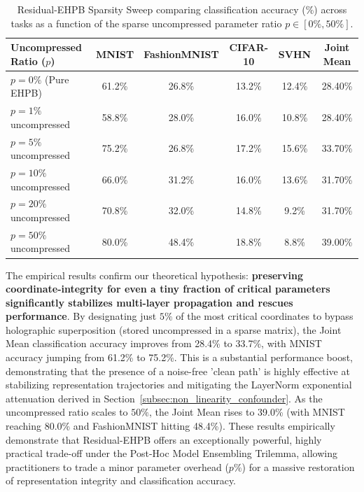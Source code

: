 \documentclass{article}
\theoremstyle{plain}
\theoremstyle{definition}
\theoremstyle{remark}
\begin{document}
\begin{table}[h]
\caption{Residual-EHPB Sparsity Sweep comparing classification accuracy (\%) across tasks as a function of the sparse uncompressed parameter ratio $p \in [0\%, 50\%]$.}
\label{tab:residual_ehpb_sweep_app}
\vskip 0.15in
\begin{center}
\begin{small}
\begin{sc}
\begin{tabular}{lccccc}
\toprule
Uncompressed Ratio ($p$) & MNIST & FashionMNIST & CIFAR-10 & SVHN & Joint Mean \\
\midrule
$p = 0\%$ (Pure EHPB) & 61.2\% & 26.8\% & 13.2\% & 12.4\% & 28.40\% \\
$p = 1\%$ uncompressed & 58.8\% & 28.0\% & 16.0\% & 10.8\% & 28.40\% \\
$p = 5\%$ uncompressed & 75.2\% & 26.8\% & 17.2\% & 15.6\% & 33.70\% \\
$p = 10\%$ uncompressed & 66.0\% & 31.2\% & 16.0\% & 13.6\% & 31.70\% \\
$p = 20\%$ uncompressed & 70.8\% & 32.0\% & 14.8\% & 9.2\% & 31.70\% \\
$p = 50\%$ uncompressed & 80.0\% & 48.4\% & 18.8\% & 8.8\% & 39.00\% \\
\bottomrule
\end{tabular}
\end{sc}
\end{small}
\end{center}
\vskip -0.1in
\end{table}

The empirical results confirm our theoretical hypothesis: \textbf{preserving coordinate-integrity for even a tiny fraction of critical parameters significantly stabilizes multi-layer propagation and rescues performance}. By designating just $5\%$ of the most critical coordinates to bypass holographic superposition (stored uncompressed in a sparse matrix), the Joint Mean classification accuracy improves from 28.4\% to 33.7\%, with MNIST accuracy jumping from 61.2\% to 75.2\%. This is a substantial performance boost, demonstrating that the presence of a noise-free 'clean path' is highly effective at stabilizing representation trajectories and mitigating the LayerNorm exponential attenuation derived in Section~\ref{subsec:non_linearity_confounder}. As the uncompressed ratio scales to $50\%$, the Joint Mean rises to 39.0\% (with MNIST reaching 80.0\% and FashionMNIST hitting 48.4\%). These results empirically demonstrate that Residual-EHPB offers an exceptionally powerful, highly practical trade-off under the Post-Hoc Model Ensembling Trilemma, allowing practitioners to trade a minor parameter overhead ($p\%$) for a massive restoration of representation integrity and classification accuracy.
\end{document}
